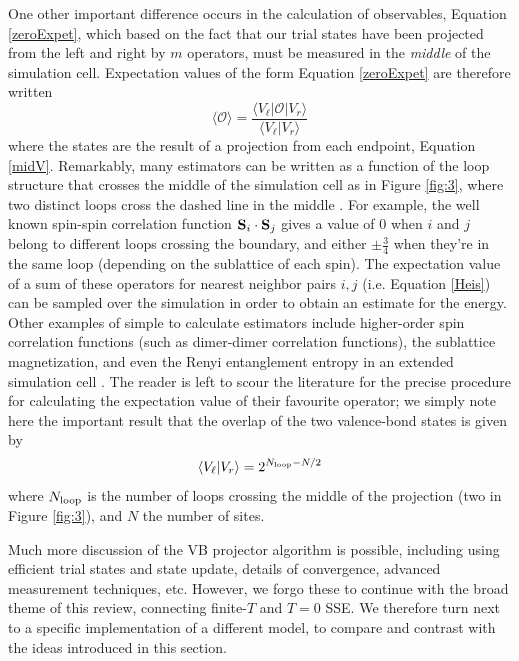 \documentclass[vecphys]{svmult}
\begin{document}
One other important difference occurs in the calculation of observables, Equation \ref{zeroExpet}, which based on the fact that our trial states have been projected from the left and right by $m$ operators, must be measured in the {\em middle} of the simulation cell.
Expectation values of the form Equation \ref{zeroExpet} are therefore written
\begin{equation}
\langle \mathcal{O} \rangle = \frac{\langle V_{\ell} | \mathcal{O} | V_r \rangle}{\langle V_{\ell} |   V_r \rangle}
\end{equation}
where the states are the result of a projection from each endpoint, Equation \ref{midV}.  
Remarkably, many estimators can be written as a function of the loop structure that crosses the middle of the simulation cell as in Figure \ref{fig:3}, where two distinct loops cross the dashed line in the middle \cite{Melko:Beach06,Melko:AWSBeach,Melko:Sandvik10a}.
For example, the well known spin-spin correlation function ${\bf S}_i \cdot {\bf S}_j$ gives a value of 0 when $i$ and $j$ belong to different loops crossing the boundary, and either $ \pm \frac{3}{4}$ when they're in the same loop (depending on the sublattice of each spin).
The expectation value of a sum of these operators for nearest neighbor pairs $i,j$ (i.e. Equation \ref{Heis}) can be sampled over the simulation in order to obtain an estimate for the energy.
Other examples of simple to calculate estimators include higher-order spin correlation functions (such as dimer-dimer correlation functions), the sublattice magnetization, and even the Renyi entanglement entropy in an extended simulation cell \cite{Melko:Hastings10}.  The reader is left to scour the literature for the precise procedure for calculating the expectation value of their favourite operator; we simply note here the important result that 
the overlap of the two valence-bond states is given by
\begin{equation}
\langle V_{\ell} |   V_r \rangle = 2^{N_{\rm loop} - N/2}
\end{equation}
where $N_{\rm loop}$ is the number of loops crossing the middle of the projection (two in Figure \ref{fig:3}), and $N$ the number of sites. 

Much more discussion of the VB projector algorithm is possible, including using efficient trial states and state update, details of convergence, advanced measurement techniques, etc. However, we forgo these to continue with the broad theme of this review, connecting finite-$T$ and $T=0$ SSE.  We therefore turn next to a specific implementation of a different model, to compare and contrast with the ideas introduced in this section.
\end{document}
